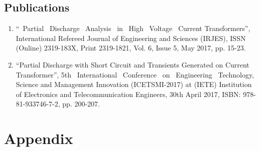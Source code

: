 %
%



\clearpage

\section*{Publications}
\begin{enumerate}
\item \textquotedblleft ~Partial ~Discharge ~Analysis ~in ~High ~Voltage ~Current Transformers\textquotedblright, International Refereed Journal of Engineering and Sciences (IRJES), ISSN (Online) 2319-183X, Print 2319-1821, Vol. 6, Issue 5, May 2017, pp. 15-23.

\item \textquotedblleft Partial Discharge with Short Circuit and Transients Generated on Current Transformer\textquotedblright, 5th ~International ~Conference ~on ~Engineering ~Technology, Science and Management Innovation (ICETSMI-2017) at (IETE) Institution of Electronics and Telecommunication Engineers, 30th April 2017, ISBN: 978-81-933746-7-2, pp. 200-207.
\end{enumerate}
\clearpage


\chapter*{Appendix}
\setlength{\parskip}{1em}
